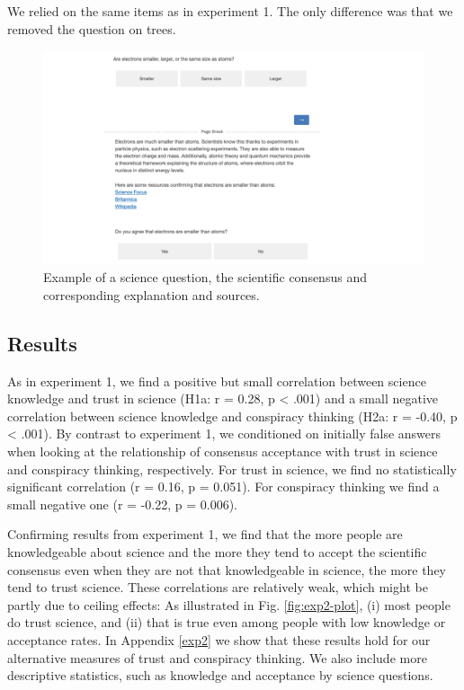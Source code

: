 \documentclass[
  doc,floatsintext]{apa6}
\begin{document}
We relied on the same items as in experiment 1. The only difference was that we removed the question on trees.

\FloatBarrier



\begin{figure}

\includegraphics[width=1\linewidth]{./figures/study2_question_example} \hfill{}

\caption{Example of a science question, the scientific consensus and corresponding explanation and sources.}\label{fig:exp2-stimulus-example}
\end{figure}

\subsection{Results}\label{results-2}

As in experiment 1, we find a positive but small correlation between science knowledge and trust in science (H1a: r = 0.28, p \textless{} .001) and a small negative correlation between science knowledge and conspiracy thinking (H2a: r = -0.40, p \textless{} .001). By contrast to experiment 1, we conditioned on initially false answers when looking at the relationship of consensus acceptance with trust in science and conspiracy thinking, respectively. For trust in science, we find no statistically significant correlation (r = 0.16, p = 0.051). For conspiracy thinking we find a small negative one (r = -0.22, p = 0.006).

Confirming results from experiment 1, we find that the more people are knowledgeable about science and the more they tend to accept the scientific consensus even when they are not that knowledgeable in science, the more they tend to trust science. These correlations are relatively weak, which might be partly due to ceiling effects: As illustrated in Fig. \ref{fig:exp2-plot}, (i) most people do trust science, and (ii) that is true even among people with low knowledge or acceptance rates. In Appendix \ref{exp2} we show that these results hold for our alternative measures of trust and conspiracy thinking. We also include more descriptive statistics, such as knowledge and acceptance by science questions.
\end{document}
